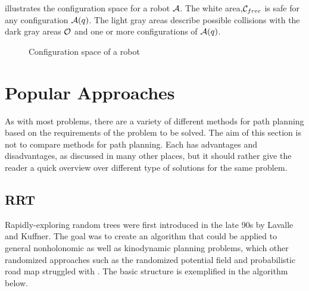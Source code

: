 illustrates the configuration space for a robot $\mathcal{A}$. The white area,$\mathcal{C}_{free}$ is safe for any configuration $\mathcal{A}(q)$. The light gray areas describe possible collisions with the dark gray areas $\mathcal{O}$ and one or more configurations of $\mathcal{A}(q)$.

\begin{figure}[h]
    \caption{Configuration space of a robot}
    \label{fig:configurationSpace}
\end{figure}

%

\section{Popular Approaches}
As with most problems, there are a variety of different methods for path planning based on the requirements of the problem to be solved. The aim of this section is not to compare methods for path planning. Each has advantages and disadvantages, as discussed in many other places, but it should rather give the reader a quick overview over different type of solutions for the same problem. %

\subsection{RRT}
Rapidly-exploring random trees were first introduced in the late 90s by Lavalle and Kuffner. The goal was to create an algorithm that could be applied to general nonholonomic as well as kinodynamic planning problems, which other randomized approaches such as the randomized potential field and probabilistic road map struggled with \cite{Lavalle.1998}. The basic structure is exemplified in the algorithm below.

